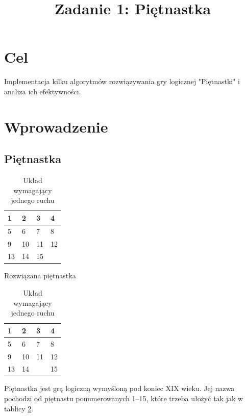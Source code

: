 \documentclass{classrep}
\author{
  \studentinfo{Patryk Lisik}{210254} \and
  \studentinfo{Adam Sadowski}{210310}
}
\title{Zadanie 1: Piętnastka}
\def \hfillx {\hspace*{-\textwidth} \hfill}
\begin{document}
\maketitle


\section{Cel}
Implementacja kilku algorytmów rozwiązywania gry logicznej "Piętnastki" i analiza ich efektywności.

\section{Wprowadzenie}
\subsection{Piętnastka}
\begin{table}[h!]
    \begin{minipage}{0.5\textwidth}
        \centering
        \begin{tabular}{|l|l|l|l|}
            \hline
            1 & 2 & 3 & 4 \\ \hline
            5 & 6 & 7 & 8 \\ \hline
            9 & 10 & 11 & 12 \\ \hline
            13 & 14 & 15 &  \\ \hline
            \end{tabular}
        \caption{Rozwiązana piętnastka}
        \label{tab:solved}
    \end{minipage}
    \hfillx
    \begin{minipage}{0.5\textwidth}
        \centering
        \begin{tabular}{|l|l|l|l|}
            \hline
            1 & 2 & 3 & 4 \\ \hline
            5 & 6 & 7 & 8 \\ \hline
            9 & 10 & 11 & 12 \\ \hline
            13 & 14 &  & 15 \\ \hline
            \end{tabular}
        \caption{Układ wymagający jednego ruchu}
    \end{minipage}
\end{table}

Piętnastka jest grą logiczną wymyśloną pod koniec XIX wieku.
Jej nazwa pochodzi od piętnastu ponumerowanych 1--15, które trzeba ułożyć tak jak w tablicy \ref{tab:solved}.
\end{document}
